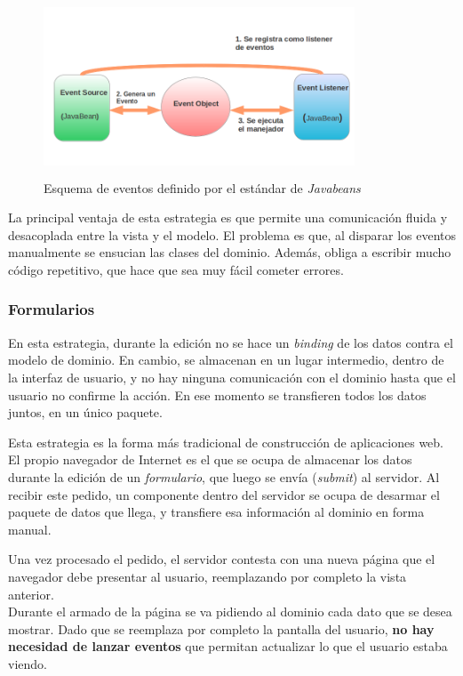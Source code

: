	
	 \begin{figure}[h]
		\includegraphics[width=350px, height=200px]{img/javabeans}
		\caption{Esquema de eventos definido por el estándar de \emph{Javabeans}}
		\label{javabeans}
	\end{figure}

	La principal ventaja de esta estrategia es que
	permite una comunicación fluida y desacoplada entre la vista y el modelo.
	El problema es que, al disparar los eventos \\
	manualmente se ensucian las
	clases del dominio. Además, obliga a escribir mucho código repetitivo, que hace que
	sea muy fácil cometer errores.

\subsubsection{Formularios}

	En esta estrategia, durante la edición no se hace un \emph{binding} de los
	datos contra el modelo de dominio. En cambio, se almacenan en un lugar
	intermedio, dentro de la interfaz de usuario, y no hay ninguna comunicación
	con el dominio hasta que el usuario no confirme la acción. En ese momento se
	transfieren todos los datos juntos, en un único paquete.
	
	Esta estrategia es la forma más tradicional de construcción de aplicaciones
	web. El propio navegador de Internet es el que se ocupa de almacenar los
	datos durante la edición de un \emph{formulario}, que luego se envía
	(\emph{submit}) al servidor. 
	Al recibir este pedido, un componente dentro del servidor se ocupa de desarmar
	el paquete de datos que llega, y transfiere esa información al dominio en forma
	manual.
	
	Una vez procesado el pedido, el servidor contesta con una nueva página que
	el \\ navegador debe presentar al usuario, reemplazando por completo la vista
	anterior.\\
	Durante el armado de la página se va pidiendo al dominio cada dato que se desea
	mostrar. Dado que se reemplaza por completo la pantalla del usuario, \textbf{no
	hay necesidad de lanzar eventos} que permitan actualizar lo que el usuario
	estaba viendo.
	

